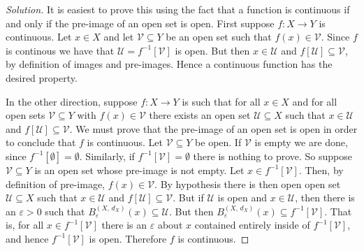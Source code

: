 \documentclass{article}
\theoremstyle{normal}
\begin{document}
    \begin{proof}[Solution]
        It is easiest to prove this using the fact that a function is continuous
        if and only if the pre-image of an open set is open. First suppose
        $f:X\rightarrow{Y}$ is continuous. Let $x\in{X}$ and let
        $\mathcal{V}\subseteq{Y}$ be an open set such that $f(x)\in\mathcal{V}$.
        Since $f$ is continous we have that $\mathcal{U}=f^{-1}[\mathcal{V}]$
        is open. But then $x\in\mathcal{U}$ and
        $f[\mathcal{U}]\subseteq\mathcal{V}$, by definition of images and
        pre-images. Hence a continuous function has the desired property.
        \par\hfill\par
        In the other direction, suppose $f:X\rightarrow{Y}$ is such that for all
        $x\in{X}$ and for all open sets $\mathcal{V}\subseteq{Y}$ with
        $f(x)\in\mathcal{V}$ there exists an open set $\mathcal{U}\subseteq{X}$
        such that $x\in\mathcal{U}$ and $f[\mathcal{U}]\subseteq\mathcal{V}$.
        We must prove that the pre-image of an open set is open in order to
        conclude that $f$ is continuous. Let $\mathcal{V}\subseteq{Y}$ be open.
        If $\mathcal{V}$ is empty we are done, since
        $f^{-1}[\emptyset]=\emptyset$. Similarly, if
        $f^{-1}[\mathcal{V}]=\emptyset$ there is nothing to prove. So suppose
        $\mathcal{V}\subseteq{Y}$ is an open set whose pre-image is not empty.
        Let $x\in{f}^{-1}[\mathcal{V}]$. Then, by definition of pre-image,
        $f(x)\in\mathcal{V}$. By hypothesis there is then open open set
        $\mathcal{U}\subseteq{X}$ such that $x\in\mathcal{U}$ and
        $f[\mathcal{U}]\subseteq\mathcal{V}$. But if $\mathcal{U}$ is open and
        $x\in\mathcal{U}$, then there is an $\varepsilon>0$ such that
        $B_{\varepsilon}^{(X,\,d_{X})}(x)\subseteq\mathcal{U}$. But then
        $B_{\varepsilon}^{(X,\,d_{X})}(x)\subseteq{f}^{-1}[\mathcal{V}]$. That
        is, for all $x\in{f}^{-1}[\mathcal{V}]$ there is an $\varepsilon$ about
        $x$ contained entirely inside of $f^{-1}[\mathcal{V}]$, and hence
        $f^{-1}[\mathcal{V}]$ is open. Therefore $f$ is continuous.
    \end{proof}
    \newpage
    \color{blue}
\end{document}

